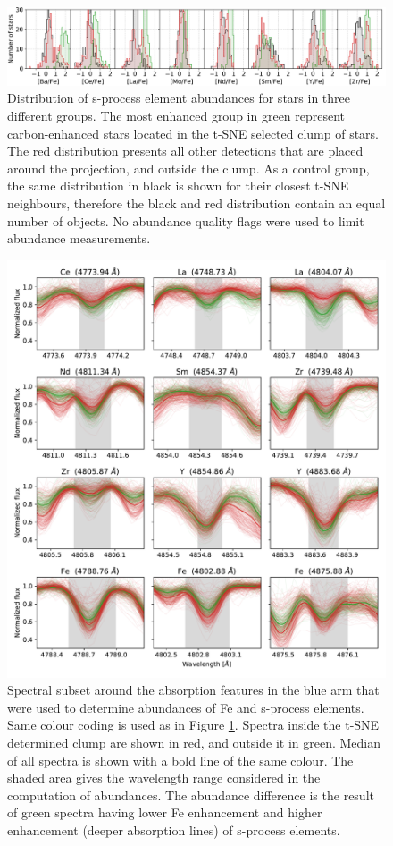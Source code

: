 \begin{figure}
	\centering
	\includegraphics[width=\textwidth]{sprocess_hist.png}
	\caption{Distribution of s-process element abundances for stars in three different groups. The most enhanced group in green represent carbon-enhanced stars located in the t-SNE selected clump of stars. The red distribution presents all other detections that are placed around the projection, and outside the clump. As a control group, the same distribution in black is shown for their closest t-SNE neighbours, therefore the black and red distribution contain an equal number of objects. No abundance quality flags were used to limit abundance measurements.}
	\label{fig:sprocess_hist}
\end{figure}

\begin{figure}
	\centering
	\includegraphics[width=\textwidth]{sprocess_spectra.pdf}
	\caption{Spectral subset around the absorption features in the blue arm that were used to determine abundances of Fe and s-process elements. Same colour coding is used as in Figure \ref{fig:sprocess_hist}. Spectra inside the t-SNE determined clump are shown in red, and outside it in green. Median of all spectra is shown with a bold line of the same colour. The shaded area gives the wavelength range considered in the computation of abundances. The abundance difference is the result of green spectra having lower Fe enhancement and higher enhancement (deeper absorption lines) of s-process elements.}
	\label{fig:sprocess_spectrum}
\end{figure} 


